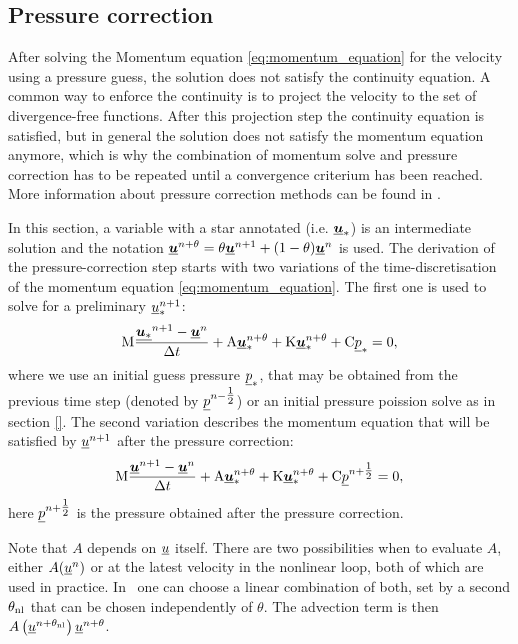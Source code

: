 \subsection{Pressure correction}\label{Sect:pressure_correction}

After solving the Momentum equation \eqref{eq:momentum_equation} for the 
velocity using a pressure guess, the solution does not satisfy the 
continuity equation. A common way to enforce the continuity is to project 
the velocity to the set of divergence-free functions. After this projection 
step the continuity equation is satisfied, but in general the solution does 
not satisfy the momentum equation anymore, which is why the combination of 
momentum solve and pressure correction has to be repeated until a 
convergence criterium has been reached. 
More information about pressure correction methods can be 
found in \cite{gresho1988}.

In this section, a variable with a star annotated (i.e. $\underline{{\mbox{\boldmath$u$}}}_*$) 
is an intermediate solution and the notation 
$\underline{{\mbox{\boldmath$u$}}}^{n+\theta}=\theta \underline{{\mbox{\boldmath$u$}}}^{n+1} + (1-\theta) \underline{{\mbox{\boldmath$u$}}}^{n}$ 
is used.  The derivation of the pressure-correction step starts with two 
variations of the time-discretisation of the 
momentum equation \eqref{eq:momentum_equation}. The first 
one is used to solve for a preliminary $\underline{u}_*^{n+1}$:
\begin{equation}\label{eqn:presscorr_1}
\mathrm{M}  \frac{{\underline{{\mbox{\boldmath$u$}}_*}^{n+1}-\underline{{\mbox{\boldmath$u$}}}^{n}}}{\Delta t}
    +\mathrm{A}\underline{{\mbox{\boldmath$u$}}}_*^{n+\theta}+\mathrm{K}\underline{{\mbox{\boldmath$u$}}}_*^{n+\theta}
    +\mathrm{C} \underline{p}_*
    =0,
\end{equation}
where we use an initial guess pressure $\underline{p}_*$, that may 
be obtained from the previous time step (denoted by 
$\underline{p}^{n-\tfrac 12}$) or an initial
pressure poission solve as in section \ref{}. The second variation
describes the momentum equation that will be satisfied by
$\underline{u}^{n+1}$ after the pressure correction:
\begin{equation}\label{eqn:presscorr_2}
\mathrm{M}  \frac{{\underline{{\mbox{\boldmath$u$}}}^{n+1}-\underline{{\mbox{\boldmath$u$}}}^{n}}}{\Delta t}
    +\mathrm{A}\underline{{\mbox{\boldmath$u$}}}_*^{n+\theta}+\mathrm{K}\underline{{\mbox{\boldmath$u$}}}_*^{n+\theta}
    +\mathrm{C} \underline{p}^{n+\tfrac 12}
    =0,
\end{equation}
here $\underline{p}^{n+\tfrac 12}$ is the pressure 
obtained after the pressure correction.

Note that $A$ depends on $\underline{u}$ itself. There are two possibilities when 
to evaluate $A$, either $A(\underline{u}^n)$ or at the latest velocity in the 
nonlinear loop, both of which are used in practice. In \fluidity\ 
one can choose a linear combination of both, set by 
a second $\theta_{\mathrm{nl}}$ that can be chosen independently of
$\theta$. The advection term is then
$A\left(\underline{u}^{n+\theta_{\mathrm{nl}}}\right)\underline{u}^{n+\theta}$.


